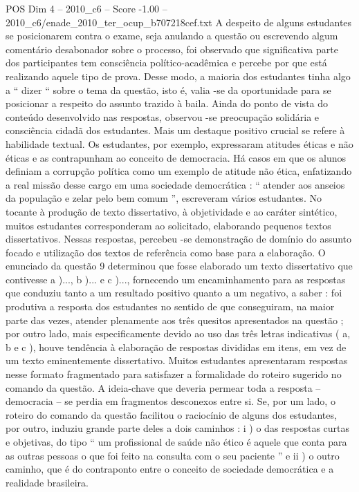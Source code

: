 \begin{textsample}{POS Dim 4 – 2010\_c6 – Score -1.00 – 2010\_c6/enade\_2010\_ter\_ocup\_b707218cef.txt}
A despeito de alguns estudantes se posicionarem contra o exame, seja anulando a questão ou escrevendo algum comentário desabonador sobre o processo, foi observado que significativa parte dos participantes tem consciência político-acadêmica e percebe por que está realizando aquele tipo de prova.
Desse modo, a maioria dos estudantes tinha algo a “ dizer “ sobre o tema da questão, isto é, valia -se da oportunidade para se posicionar a respeito do assunto trazido à baila.
Ainda do ponto de vista do conteúdo desenvolvido nas respostas, observou -se preocupação solidária e consciência cidadã dos estudantes.
Mais um destaque positivo crucial se refere à habilidade textual.
Os estudantes, por exemplo, expressaram atitudes éticas e não éticas e as contrapunham ao conceito de democracia.
Há casos em que os alunos definiam a corrupção política como um exemplo de atitude não ética, enfatizando a real missão desse cargo em uma sociedade democrática : “ atender aos anseios da população e zelar pelo bem comum ”, escreveram vários estudantes.
No tocante à produção de texto dissertativo, à objetividade e ao caráter sintético, muitos estudantes corresponderam ao solicitado, elaborando pequenos textos dissertativos.
Nessas respostas, percebeu -se demonstração de domínio do assunto focado e utilização dos textos de referência como base para a elaboração.
O enunciado da questão 9 determinou que fosse elaborado um texto dissertativo que contivesse a )..., b )... e c )..., fornecendo um encaminhamento para as respostas que conduziu tanto a um resultado positivo quanto a um negativo, a saber : foi produtiva a resposta dos estudantes no sentido de que conseguiram, na maior parte das vezes, atender plenamente aos três quesitos apresentados na questão ; por outro lado, mais especificamente devido ao uso das três letras indicativas ( a, b e c ), houve tendência à elaboração de respostas divididas em itens, em vez de um texto eminentemente dissertativo.
Muitos estudantes apresentaram respostas nesse formato fragmentado para satisfazer a formalidade do roteiro sugerido no comando da questão.
A ideia-chave que deveria permear toda a resposta – democracia – se perdia em fragmentos desconexos entre si.
Se, por um lado, o roteiro do comando da questão facilitou o raciocínio de alguns dos estudantes, por outro, induziu grande parte deles a dois caminhos : i ) o das respostas curtas e objetivas, do tipo “ um profissional de saúde não ético é aquele que conta para as outras pessoas o que foi feito na consulta com o seu paciente ” e ii ) o outro caminho, que é do contraponto entre o conceito de sociedade democrática e a realidade brasileira.

\end{textsample}
